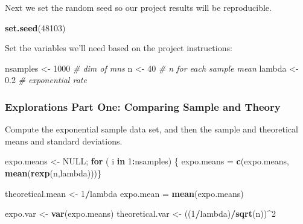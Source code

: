 \documentclass[]{article}
\newenvironment{Shaded}{\begin{snugshade}}{\end{snugshade}}
\newcommand{\KeywordTok}[1]{\textcolor[rgb]{0.13,0.29,0.53}{\textbf{#1}}}
\newcommand{\DecValTok}[1]{\textcolor[rgb]{0.00,0.00,0.81}{#1}}
\newcommand{\FloatTok}[1]{\textcolor[rgb]{0.00,0.00,0.81}{#1}}
\newcommand{\StringTok}[1]{\textcolor[rgb]{0.31,0.60,0.02}{#1}}
\newcommand{\CommentTok}[1]{\textcolor[rgb]{0.56,0.35,0.01}{\textit{#1}}}
\newcommand{\OtherTok}[1]{\textcolor[rgb]{0.56,0.35,0.01}{#1}}
\newcommand{\ControlFlowTok}[1]{\textcolor[rgb]{0.13,0.29,0.53}{\textbf{#1}}}
\newcommand{\OperatorTok}[1]{\textcolor[rgb]{0.81,0.36,0.00}{\textbf{#1}}}
\newcommand{\NormalTok}[1]{#1}
\begin{document}
Next we set the random seed so our project results will be reproducible.

\begin{Shaded}
\begin{Highlighting}[]
\KeywordTok{set.seed}\NormalTok{(}\DecValTok{48103}\NormalTok{)}
\end{Highlighting}
\end{Shaded}

Set the variables we'll need based on the project instructions:

\begin{Shaded}
\begin{Highlighting}[]
\NormalTok{nsamples <-}\StringTok{ }\DecValTok{1000} \CommentTok{# dim of mns}
\NormalTok{n <-}\StringTok{ }\DecValTok{40} \CommentTok{# n for each sample mean}
\NormalTok{lambda <-}\StringTok{ }\FloatTok{0.2} \CommentTok{# exponential rate}
\end{Highlighting}
\end{Shaded}

\subsubsection{Explorations Part One: Comparing Sample and
Theory}\label{explorations-part-one-comparing-sample-and-theory}

Compute the exponential sample data set, and then the sample and
theoretical means and standard deviations.

\begin{Shaded}
\begin{Highlighting}[]
\NormalTok{expo.means <-}\StringTok{ }\OtherTok{NULL}\NormalTok{; }\ControlFlowTok{for}\NormalTok{ ( i }\ControlFlowTok{in} \DecValTok{1}\OperatorTok{:}\NormalTok{nsamples) \{ expo.means =}\StringTok{ }\KeywordTok{c}\NormalTok{(expo.means, }\KeywordTok{mean}\NormalTok{(}\KeywordTok{rexp}\NormalTok{(n,lambda)))\}}

\NormalTok{theoretical.mean <-}\StringTok{ }\DecValTok{1}\OperatorTok{/}\NormalTok{lambda}
\NormalTok{expo.mean =}\StringTok{ }\KeywordTok{mean}\NormalTok{(expo.means)}

\NormalTok{expo.var <-}\StringTok{ }\KeywordTok{var}\NormalTok{(expo.means)}
\NormalTok{theoretical.var <-}\StringTok{ }\NormalTok{((}\DecValTok{1}\OperatorTok{/}\NormalTok{lambda)}\OperatorTok{/}\KeywordTok{sqrt}\NormalTok{(n))}\OperatorTok{^}\DecValTok{2}
\end{Highlighting}
\end{Shaded}
\end{document}
